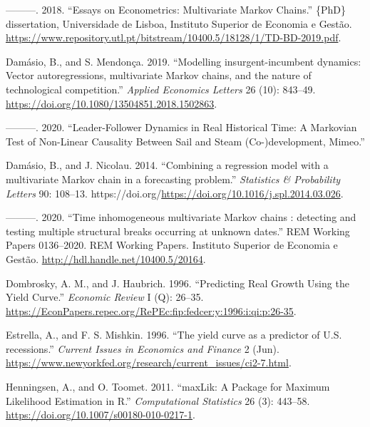 \begin{CSLReferences}{1}{0}
\leavevmode{}%
---------. 2018. {``{Essays on Econometrics: Multivariate Markov Chains}.''} \{PhD\} dissertation, Universidade de Lisboa, Instituto Superior de Economia e Gestão. \url{https://www.repository.utl.pt/bitstream/10400.5/18128/1/TD-BD-2019.pdf}.

\leavevmode{}%
Damásio, B., and S. Mendonça. 2019. {``{Modelling insurgent-incumbent dynamics: Vector autoregressions, multivariate Markov chains, and the nature of technological competition}.''} \emph{Applied Economics Letters} 26 (10): 843--49. \url{https://doi.org/10.1080/13504851.2018.1502863}.

\leavevmode{}%
---------. 2020. {``Leader-Follower Dynamics in Real Historical Time: A Markovian Test of Non-Linear Causality Between Sail and Steam (Co-)development, Mimeo.''}

\leavevmode{}%
Damásio, B., and J. Nicolau. 2014. {``{Combining a regression model with a multivariate Markov chain in a forecasting problem}.''} \emph{Statistics \& Probability Letters} 90: 108--13. https://doi.org/\url{https://doi.org/10.1016/j.spl.2014.03.026}.

\leavevmode{}%
---------. 2020. {``{Time inhomogeneous multivariate Markov chains : detecting and testing multiple structural breaks occurring at unknown dates}.''} REM Working Papers 0136--2020. REM Working Papers. Instituto Superior de Economia e Gestão. \url{http://hdl.handle.net/10400.5/20164}.

\leavevmode{}%
Dombrosky, A. M., and J. Haubrich. 1996. {``Predicting Real Growth Using the Yield Curve.''} \emph{Economic Review} I (Q): 26--35. \url{https://EconPapers.repec.org/RePEc:fip:fedcer:y:1996:i:qi:p:26-35}.

\leavevmode{}%
Estrella, A., and F. S. Mishkin. 1996. {``{The yield curve as a predictor of U.S. recessions}.''} \emph{Current Issues in Economics and Finance} 2 (Jun). \url{https://www.newyorkfed.org/research/current_issues/ci2-7.html}.

\leavevmode{}%
Henningsen, A., and O. Toomet. 2011. {``maxLik: A Package for Maximum Likelihood Estimation in {R}.''} \emph{Computational Statistics} 26 (3): 443--58. \url{https://doi.org/10.1007/s00180-010-0217-1}.


\end{CSLReferences}
